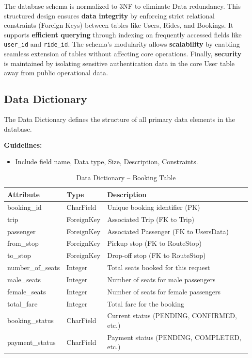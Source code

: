 The database schema is normalized to 3NF to eliminate Data redundancy. This structured design ensures \textbf{data integrity} by enforcing strict relational constraints (Foreign Keys) between tables like Users, Rides, and Bookings. It supports \textbf{efficient querying} through indexing on frequently accessed fields like \texttt{user\_id} and \texttt{ride\_id}. The schema's modularity allows \textbf{scalability} by enabling seamless extension of tables without affecting core operations. Finally, \textbf{security} is maintained by isolating sensitive authentication data in the core User table away from public operational data.

\subsection{Data Dictionary}

The Data Dictionary defines the structure of all primary data elements in the database.

\textbf{Guidelines:}
\begin{itemize}
    \item Include field name, Data type, Size, Description, Constraints.
\end{itemize}

\begin{table}[H]
\centering
\caption{Data Dictionary – Booking Table}
\renewcommand{\arraystretch}{1.5}
\begin{tabular}{|p{3cm}|p{3cm}|p{7cm}|}
\hline
\textbf{Attribute} & \textbf{Type} & \textbf{Description} \\
\hline
booking\_id & CharField & Unique booking identifier (PK) \\
\hline
trip & ForeignKey & Associated Trip (FK to Trip) \\
\hline
passenger & ForeignKey & Associated Passenger (FK to UsersData) \\
\hline
from\_stop & ForeignKey & Pickup stop (FK to RouteStop) \\
\hline
to\_stop & ForeignKey & Drop-off stop (FK to RouteStop) \\
\hline
number\_of\_seats & Integer & Total seats booked for this request \\
\hline
male\_seats & Integer & Number of seats for male passengers \\
\hline
female\_seats & Integer & Number of seats for female passengers \\
\hline
total\_fare & Integer & Total fare for the booking \\
\hline
booking\_status & CharField & Current status (PENDING, CONFIRMED, etc.) \\
\hline
payment\_status & CharField & Payment status (PENDING, COMPLETED, etc.) \\
\hline
\end{tabular}
\end{table}


